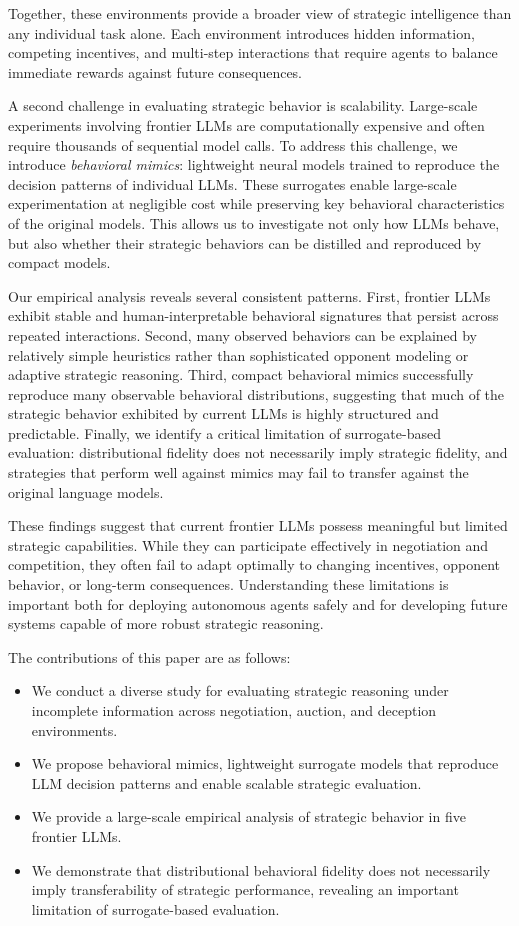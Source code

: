 \documentclass[conference]{IEEEtran}
\begin{document}
Together, these environments provide a broader view of strategic intelligence than any individual task alone. Each environment introduces hidden information, competing incentives, and multi-step interactions that require agents to balance immediate rewards against future consequences.

A second challenge in evaluating strategic behavior is scalability. Large-scale experiments involving frontier LLMs are computationally expensive and often require thousands of sequential model calls. To address this challenge, we introduce \emph{behavioral mimics}: lightweight neural models trained to reproduce the decision patterns of individual LLMs. These surrogates enable large-scale experimentation at negligible cost while preserving key behavioral characteristics of the original models. This allows us to investigate not only how LLMs behave, but also whether their strategic behaviors can be distilled and reproduced by compact models.

Our empirical analysis reveals several consistent patterns. First, frontier LLMs exhibit stable and human-interpretable behavioral signatures that persist across repeated interactions. Second, many observed behaviors can be explained by relatively simple heuristics rather than sophisticated opponent modeling or adaptive strategic reasoning. Third, compact behavioral mimics successfully reproduce many observable behavioral distributions, suggesting that much of the strategic behavior exhibited by current LLMs is highly structured and predictable. Finally, we identify a critical limitation of surrogate-based evaluation: distributional fidelity does not necessarily imply strategic fidelity, and strategies that perform well against mimics may fail to transfer against the original language models.

These findings suggest that current frontier LLMs possess meaningful but limited strategic capabilities. While they can participate effectively in negotiation and competition, they often fail to adapt optimally to changing incentives, opponent behavior, or long-term consequences. Understanding these limitations is important both for deploying autonomous agents safely and for developing future systems capable of more robust strategic reasoning.

The contributions of this paper are as follows:

\begin{itemize}
\item We conduct a diverse study for evaluating strategic reasoning under incomplete information across negotiation, auction, and deception environments.
\item We propose behavioral mimics, lightweight surrogate models that reproduce LLM decision patterns and enable scalable strategic evaluation.
\item We provide a large-scale empirical analysis of strategic behavior in five frontier LLMs.
\item We demonstrate that distributional behavioral fidelity does not necessarily imply transferability of strategic performance, revealing an important limitation of surrogate-based evaluation.
\end{itemize}
\end{document}
